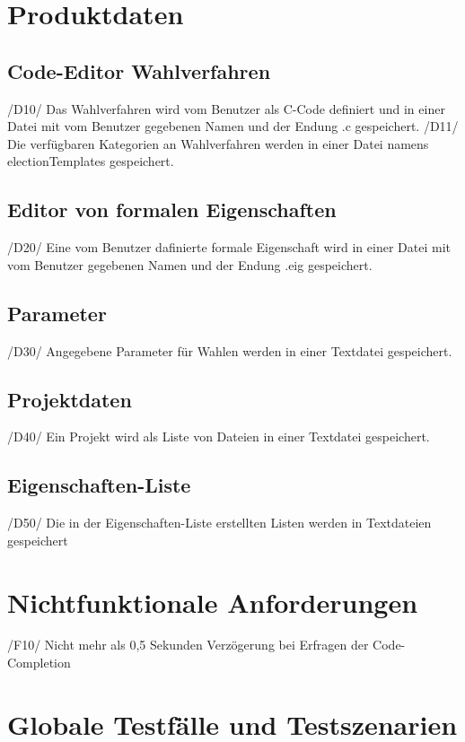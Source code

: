 \documentclass[a4paper]{scrreprt}
\begin{document}
\chapter{Produktdaten}
\section{Code-Editor Wahlverfahren}
/D10/ Das Wahlverfahren wird vom \gls{Benutzer} als C-Code definiert und in einer Datei mit vom \gls{Benutzer} gegebenen Namen und der Endung .c gespeichert.
/D11/ Die verfügbaren Kategorien an Wahlverfahren werden in einer Datei namens electionTemplates gespeichert.

\section{Editor von formalen Eigenschaften}
/D20/ Eine vom \gls{Benutzer} dafinierte formale Eigenschaft wird in einer Datei mit vom \gls{Benutzer} gegebenen Namen und der Endung .eig gespeichert.

\section{Parameter}
/D30/ Angegebene Parameter für Wahlen werden in einer Textdatei gespeichert.


\section{Projektdaten}
/D40/ Ein Projekt wird als Liste von Dateien in einer Textdatei gespeichert.

\section{Eigenschaften-Liste}
/D50/ Die in der Eigenschaften-Liste erstellten Listen werden in Textdateien gespeichert

\chapter{Nichtfunktionale Anforderungen}
/F10/ Nicht mehr als 0,5 Sekunden Verzögerung bei Erfragen der Code-Completion


\chapter{Globale Testfälle und Testszenarien}
\end{document}
